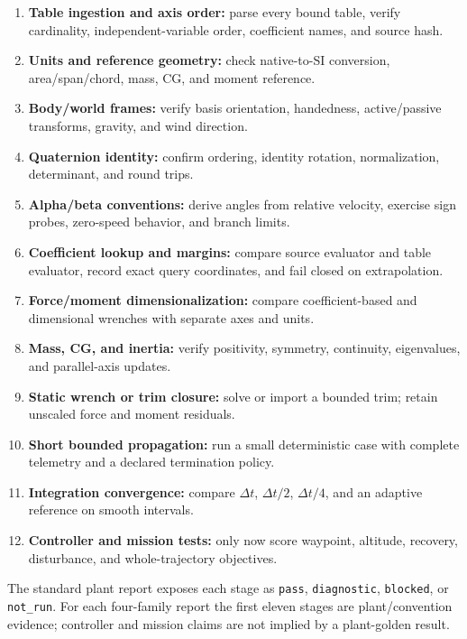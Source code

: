 \documentclass[11pt]{article}
\begin{document}
\begin{enumerate}
  \item \textbf{Table ingestion and axis order:} parse every bound table,
    verify cardinality, independent-variable order, coefficient names, and
    source hash.
  \item \textbf{Units and reference geometry:} check native-to-SI conversion,
    area/span/chord, mass, CG, and moment reference.
  \item \textbf{Body/world frames:} verify basis orientation, handedness,
    active/passive transforms, gravity, and wind direction.
  \item \textbf{Quaternion identity:} confirm ordering, identity rotation,
    normalization, determinant, and round trips.
  \item \textbf{Alpha/beta conventions:} derive angles from relative velocity,
    exercise sign probes, zero-speed behavior, and branch limits.
  \item \textbf{Coefficient lookup and margins:} compare source evaluator and
    table evaluator, record exact query coordinates, and fail closed on
    extrapolation.
  \item \textbf{Force/moment dimensionalization:} compare coefficient-based
    and dimensional wrenches with separate axes and units.
  \item \textbf{Mass, CG, and inertia:} verify positivity, symmetry,
    continuity, eigenvalues, and parallel-axis updates.
  \item \textbf{Static wrench or trim closure:} solve or import a bounded trim;
    retain unscaled force and moment residuals.
  \item \textbf{Short bounded propagation:} run a small deterministic case with
    complete telemetry and a declared termination policy.
  \item \textbf{Integration convergence:} compare $\Delta t$, $\Delta t/2$,
    $\Delta t/4$, and an adaptive reference on smooth intervals.
  \item \textbf{Controller and mission tests:} only now score waypoint,
    altitude, recovery, disturbance, and whole-trajectory objectives.
\end{enumerate}

The standard plant report exposes each stage as \texttt{pass}, \texttt{diagnostic},
\texttt{blocked}, or \texttt{not\_run}. For each four-family report the first
eleven stages are plant/convention evidence; controller and mission claims are
not implied by a plant-golden result.
\end{document}
